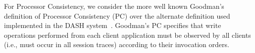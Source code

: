 \documentclass[acmlarge, ,11pt]{acmart}
\begin{document}
For Processor Consistency, we consider the more
  well known Goodman's definition of Processor Consistency (PC) over the alternate definition used implemented in the DASH system~\cite{Ahamad:1993:PPC:165231.165264}. Goodman's PC specifies that write operations performed from each client application must be observed by all clients (i.e., must occur in all  session traces) according to their invocation orders. %
\end{document}

